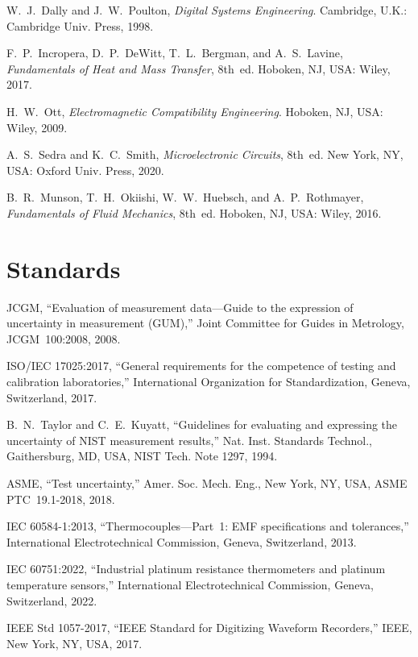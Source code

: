 \begin{enumerate}[label={[\arabic*]},leftmargin=2em]
\item W.~J.~Dally and J.~W.~Poulton, \emph{Digital Systems Engineering}. Cambridge, U.K.: Cambridge Univ. Press, 1998.
\item F.~P.~Incropera, D.~P.~DeWitt, T.~L.~Bergman, and A.~S.~Lavine, \emph{Fundamentals of Heat and Mass Transfer}, 8th~ed. Hoboken, NJ, USA: Wiley, 2017.
\item H.~W.~Ott, \emph{Electromagnetic Compatibility Engineering}. Hoboken, NJ, USA: Wiley, 2009.
\item A.~S.~Sedra and K.~C.~Smith, \emph{Microelectronic Circuits}, 8th~ed. New York, NY, USA: Oxford Univ. Press, 2020.
\item B.~R.~Munson, T.~H.~Okiishi, W.~W.~Huebsch, and A.~P.~Rothmayer, \emph{Fundamentals of Fluid Mechanics}, 8th~ed. Hoboken, NJ, USA: Wiley, 2016.
\end{enumerate}

\section*{Standards}

\begin{enumerate}[label={[\arabic*]},leftmargin=2em,resume]
\item JCGM, ``Evaluation of measurement data---Guide to the expression of uncertainty in measurement (GUM),'' Joint Committee for Guides in Metrology, JCGM~100:2008, 2008.
\item ISO/IEC 17025:2017, ``General requirements for the competence of testing and calibration laboratories,'' International Organization for Standardization, Geneva, Switzerland, 2017.
\item B.~N.~Taylor and C.~E.~Kuyatt, ``Guidelines for evaluating and expressing the uncertainty of NIST measurement results,'' Nat. Inst. Standards Technol., Gaithersburg, MD, USA, NIST Tech. Note 1297, 1994.
\item ASME, ``Test uncertainty,'' Amer. Soc. Mech. Eng., New York, NY, USA, ASME PTC~19.1-2018, 2018.
\item IEC 60584-1:2013, ``Thermocouples---Part~1: EMF specifications and tolerances,'' International Electrotechnical Commission, Geneva, Switzerland, 2013.
\item IEC 60751:2022, ``Industrial platinum resistance thermometers and platinum temperature sensors,'' International Electrotechnical Commission, Geneva, Switzerland, 2022.
\item IEEE Std 1057-2017, ``IEEE Standard for Digitizing Waveform Recorders,'' IEEE, New York, NY, USA, 2017.
\end{enumerate}

